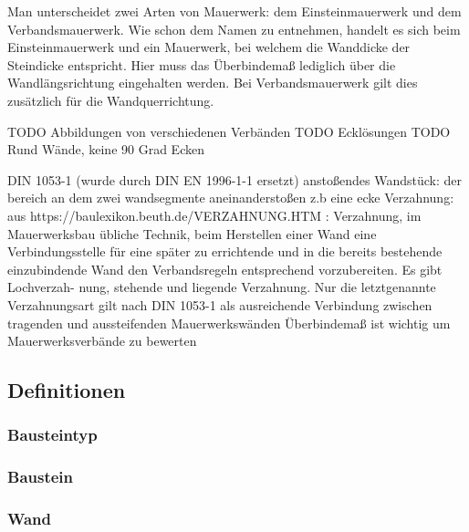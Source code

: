 Man unterscheidet zwei Arten von Mauerwerk: dem Einsteinmauerwerk und dem Verbandsmauerwerk.
Wie schon dem Namen zu entnehmen, handelt es sich beim Einsteinmauerwerk und ein Mauerwerk, bei welchem die Wanddicke der Steindicke entspricht.
Hier muss das Überbindemaß lediglich über die Wandlängsrichtung eingehalten werden.
Bei Verbandsmauerwerk gilt dies zusätzlich für die Wandquerrichtung. \cite{05maurer1:online}

TODO Abbildungen von verschiedenen Verbänden
TODO Ecklösungen
TODO Rund Wände, keine 90 Grad Ecken

DIN 1053-1 (wurde durch DIN EN 1996-1-1 ersetzt)
anstoßendes Wandstück: der bereich an dem zwei wandsegmente aneinanderstoßen z.b eine ecke
Verzahnung: aus https://baulexikon.beuth.de/VERZAHNUNG.HTM : Verzahnung, im Mauerwerksbau übliche Technik, beim Herstellen einer Wand eine Verbindungsstelle für eine später zu errichtende und in die bereits bestehende einzubindende Wand den Verbandsregeln entsprechend vorzubereiten. Es gibt Lochverzah- nung, stehende und liegende Verzahnung. Nur die letztgenannte Verzahnungsart gilt nach DIN 1053-1 als ausreichende Verbindung zwischen tragenden und aussteifenden Mauerwerkswänden
Überbindemaß ist wichtig um Mauerwerksverbände zu bewerten

\subsection{Definitionen}
\subsubsection{Bausteintyp}
\subsubsection{Baustein}
\subsubsection{Wand}